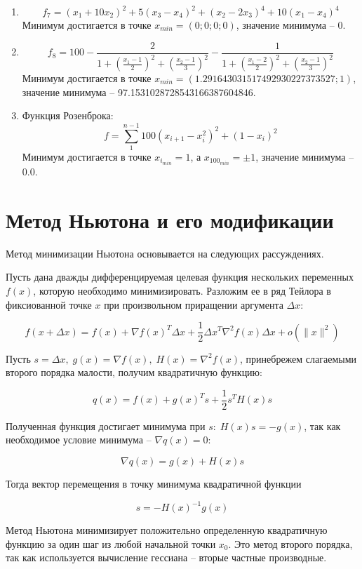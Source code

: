 \documentclass[12pt]{article}
\begin{document}
\begin{enumerate}
 	\item \[ f_7 = (x_1+10x_2)^2+5(x_3-x_4)^2+(x_2-2x_3)^4+10(x_1-x_4)^4 \]
 	Минимум достигается в точке $x_{min} = (0; 0; 0; 0)$, значение минимума -- 0.

 	\item \[ f_8 = 100 - \frac{2}{1+\left( \frac{x_1-1}{2} \right) ^2 + \left( \frac{x_2-1}{3} \right) ^2} - \frac{1}{1+\left( \frac{x_1-2}{2} \right) ^2 + \left( \frac{x_2-1}{3} \right) ^2}\]
 	Минимум достигается в точке $x_{min} = (1.291643031517492930227373527; 1)$, значение минимума -- 97.1531028728543166387604846.

 	\item Функция Розенброка:
 	\[ f = \sum_1^{n-1} 100(x_{i+1}-x_i^2)^2+(1-x_i)^2 \]
 	Минимум достигается в точке $x_{i_{min}} = 1$, а $x_{{100}_{min}} = \pm 1$, значение минимума -- 0.0.
\end{enumerate}

\newpage
\section{Метод Ньютона и его модификации}

Метод минимизации Ньютона основывается на следующих рассуждениях.

Пусть дана дважды дифференцируемая целевая функция нескольких переменных $f(x)$, которую необходимо минимизировать. Разложим ее в ряд Тейлора в фиксиованной точке $x$ при произвольном приращении аргумента $\Delta x$:

\[ f(x+\Delta x) = f(x) + \nabla f(x)^T \Delta x + \frac{1}{2} \Delta x^T \nabla^2f(x)\Delta x + o(\lVert x \rVert ^ 2) \]

Пусть $s = \Delta x, \; g(x) = \nabla f(x), \; H(x) = \nabla^2 f(x)$, принебрежем слагаемыми второго порядка малости, получим квадратичную функцию:

\[ q(x) = f(x) + g(x)^Ts + \frac{1}{2} s^T H(x)s \]

Полученная функция достигает минимума при $s: \; H(x)s = -g(x)$, так как необходимое условие минимума -- $\nabla q(x) = 0$:

\[ \nabla q(x) = g(x)+H(x)s \]

Тогда вектор перемещения в точку минимума квадратичной функции

\[ s = -H(x)^{-1} g(x) \]

Метод Ньютона минимизирует положительно определенную квадратичную функцию за один шаг из любой начальной точки $x_0$. Это метод второго порядка, так как используется вычисление гессиана -- вторые частные производные.
\end{document}
